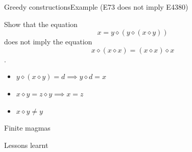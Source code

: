 \documentclass{beamer}
\newcommand{\op}{\diamond}
\begin{document}
\begin{frame}{Greedy constructions}{Example (E73 does not imply E4380)}

Show that the equation $$x = y \op (y \op (x \op y))$$ does not imply
the equation $$x \op (x \op x) = (x \op x) \op x$$
.
\begin{itemize}
	\pause\item $y \op (x \op y) = d \implies y \op d = x$
	\pause\item $x \op y = z \op y \implies x=z$
	\pause\item $x \op y \ne y$
\end{itemize}

\end{frame}


\begin{frame}{Finite magmas}
\end{frame}


\begin{frame}{Lessons learnt}
\end{frame}
\end{document}
